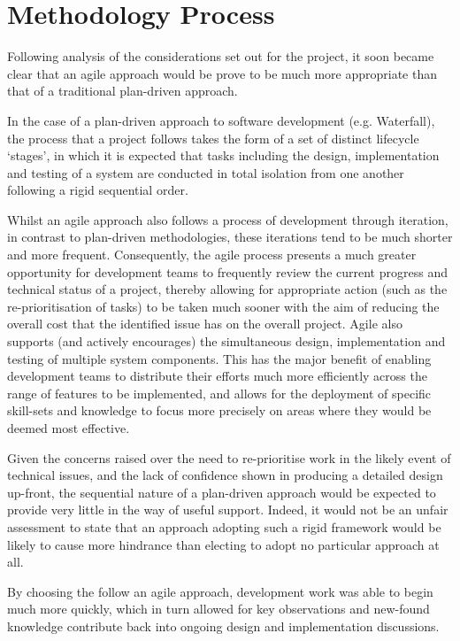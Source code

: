 \section{Methodology Process}

Following analysis of the considerations set out for the project, it soon became clear that an agile approach would be prove to be much more appropriate than that of a traditional plan-driven approach.

In the case of a plan-driven approach to software development (e.g. Waterfall), the process that a project follows takes the form of a set of distinct lifecycle `stages', in which it is expected that tasks including the design, implementation and testing of a system are conducted in total isolation from one another following a rigid sequential order.

Whilst an agile approach also follows a process of development through iteration, in contrast to plan-driven methodologies, these iterations tend to be much shorter and more frequent. Consequently, the agile process presents a much greater opportunity for development teams to frequently review the current progress and technical status of a project, thereby allowing for appropriate action (such as the re-prioritisation of tasks) to be taken much sooner with the aim of reducing the overall cost that the identified issue has on the overall project. Agile also supports (and actively encourages) the simultaneous design, implementation and testing of multiple system components. This has the major benefit of enabling development teams to distribute their efforts much more efficiently across the range of features to be implemented, and allows for the deployment of specific skill-sets and knowledge to focus more precisely on areas where they would be deemed most effective.

Given the concerns raised over the need to re-prioritise work in the likely event of technical issues, and the lack of confidence shown in producing a detailed design up-front, the sequential nature of a plan-driven approach would be expected to provide very little in the way of useful support. Indeed, it would not be an unfair assessment to state that an approach adopting such a rigid framework would be likely to cause more hindrance than electing to adopt no particular approach at all.

 By choosing the follow an agile approach, development work was able to begin much more quickly, which in turn allowed for key observations and new-found knowledge contribute back into ongoing design and implementation discussions.


